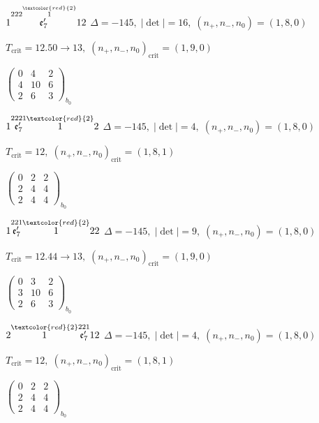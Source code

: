 \documentclass[10pt]{article}
\begin{document}
$1\overset{222\overset{\textcolor{red}{2}}{1}}{\mathfrak{e}_7'}12$ \quad $\Delta=-145,\; |\det|=16,\; (n_+,n_-,n_0)=(1,8,0)$

\hspace{1em}$T_{\text{crit}}=12.50 \to 13,\; (n_+,n_-,n_0)_{\text{crit}}=(1,9,0)$

\hspace{2em}$\left(\begin{smallmatrix}0 & 4 & 2 \\ 4 & 10 & 6 \\ 2 & 6 & 3\end{smallmatrix}\right)_{\!b_0}$

$1\overset{2221}{\mathfrak{e}_7'}\overset{\textcolor{red}{2}}{1}2$ \quad $\Delta=-145,\; |\det|=4,\; (n_+,n_-,n_0)=(1,8,0)$

\hspace{1em}$T_{\text{crit}}=12,\; (n_+,n_-,n_0)_{\text{crit}}=(1,8,1)$

\hspace{2em}$\left(\begin{smallmatrix}0 & 2 & 2 \\ 2 & 4 & 4 \\ 2 & 4 & 4\end{smallmatrix}\right)_{\!b_0}$

\smallskip

$1\overset{221}{\mathfrak{e}_7'}\overset{\textcolor{red}{2}}{1}22$ \quad $\Delta=-145,\; |\det|=9,\; (n_+,n_-,n_0)=(1,8,0)$

\hspace{1em}$T_{\text{crit}}=12.44 \to 13,\; (n_+,n_-,n_0)_{\text{crit}}=(1,9,0)$

\hspace{2em}$\left(\begin{smallmatrix}0 & 3 & 2 \\ 3 & 10 & 6 \\ 2 & 6 & 3\end{smallmatrix}\right)_{\!b_0}$

\smallskip

$2\overset{\textcolor{red}{2}}{1}\overset{221}{\mathfrak{e}_7'}12$ \quad $\Delta=-145,\; |\det|=4,\; (n_+,n_-,n_0)=(1,8,0)$

\hspace{1em}$T_{\text{crit}}=12,\; (n_+,n_-,n_0)_{\text{crit}}=(1,8,1)$

\hspace{2em}$\left(\begin{smallmatrix}0 & 2 & 2 \\ 2 & 4 & 4 \\ 2 & 4 & 4\end{smallmatrix}\right)_{\!b_0}$
\end{document}
